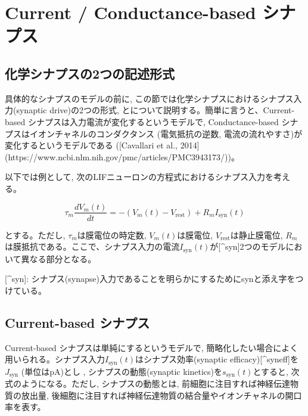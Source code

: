 \section{Current / Conductance-based シナプス
}


\subsection{化学シナプスの2つの記述形式
}


具体的なシナプスのモデルの前に, この節では化学シナプスにおけるシナプス入力(synaptic drive)の2つの形式, \textbf{}と\textbf{}について説明する。簡単に言うと、Current-based シナプスは入力電流が変化するというモデルで, Conductance-based シナプスはイオンチャネルのコンダクタンス (電気抵抗の逆数, 電流の流れやすさ)が変化するというモデルである ([Cavallari et al., 2014](https://www.ncbi.nlm.nih.gov/pmc/articles/PMC3943173/))。



以下では例として, 次のLIFニューロンの方程式におけるシナプス入力を考える。



\begin{equation}

\tau_m \frac{dV_{m}(t)}{dt}=-(V_{m}(t)-V_\text{rest})+R_m I_{\text{syn}}(t)    

\end{equation}



とする。ただし, $\tau_m$は膜電位の時定数, $V_m(t)$は膜電位, $V_\text{rest}$は静止膜電位, $R_m$は膜抵抗である。ここで、シナプス入力の電流$I_{\text{syn}}(t)$が[^syn]2つのモデルにおいて異なる部分となる。



[^syn]: シナプス(synapse)入力であることを明らかにするためにsynと添え字をつけている。



\subsection{Current-based シナプス
}
Current-based シナプスは単純に\textbf{}するというモデルで, 簡略化したい場合によく用いられる。シナプス入力$I_{\text{syn}}(t)$はシナプス効率(synaptic efficacy)[^syneff]を$J_{\text{syn}}$ (単位はpA)とし , シナプスの動態(synaptic kinetics)を$s_{\text{syn}}(t)$とすると, 次式のようになる。ただし, シナプスの動態とは, 前細胞に注目すれば神経伝達物質の放出量, 後細胞に注目すれば神経伝達物質の結合量やイオンチャネルの開口率を表す。






